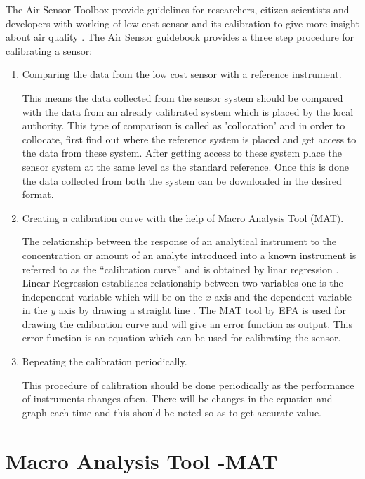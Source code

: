 The Air Sensor Toolbox provide guidelines for researchers, citizen scientists and developers with working of low cost sensor and its calibration to give more insight about air quality \cite{airsensortoolbox}. The Air Sensor guidebook\cite{airsensorguidebook} provides a three step procedure for calibrating a sensor:
\begin{enumerate}
    \item Comparing the data from the low cost sensor with a reference instrument.
    
This means the data collected from the sensor system should be compared with the data from an already calibrated system which is placed by the local authority. This type of comparison is called as 'collocation' and in order to collocate, first find out where the reference system is placed and get access to the data from these system. After getting access to these system place the sensor system at the same level as the standard reference. Once this is done the data collected from both the system can be downloaded in the desired format.

    \item Creating a calibration curve with the help of Macro Analysis Tool (MAT).

The relationship between the response of an analytical instrument to the concentration or amount of an analyte introduced into a known instrument is referred to as the “calibration curve” \cite{Epa2010} and is obtained by linar regression \cite{Burke}. Linear Regression establishes relationship between two variables one is the independent variable which will be on the $x$ axis and the dependent variable in the $y$ axis by drawing a straight line \cite{regression}. The MAT tool by EPA is used for drawing the calibration curve and will give an error function as output. This error function is an equation which can be used for calibrating the sensor.
    \item Repeating the calibration periodically.

    This procedure of calibration should be done periodically as the performance of instruments changes often. There will be changes in the equation and graph each time and this should be noted so as to get accurate value.
\end{enumerate} 

\section{Macro Analysis Tool -MAT}

